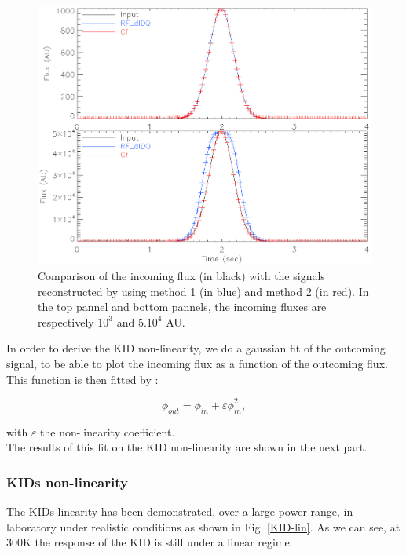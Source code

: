 \begin{figure}[h]
\includegraphics[scale=0.6]{Figures/planets.eps}
\caption{Comparison of the incoming flux (in black) with the signals reconstructed by using method 1 (in blue) and method 2 (in red). In the top pannel and bottom pannels, the incoming fluxes are respectively $10^{3}$ and $5.10^{4}$ AU.}
\label{planet}
\end{figure}

In order to derive the KID non-linearity, we do a gaussian fit of the outcoming signal, to be able to plot the incoming flux as a function of the outcoming flux. This function is then fitted by :

\begin{equation}
\phi_{out} = \phi_{in} + \varepsilon \phi_{in}^{2} ,
\label{fit_NL}
\end{equation}

with $\varepsilon$ the non-linearity coefficient.\\
The results of this fit on the KID non-linearity are shown in the next part.

\subsubsection{KIDs non-linearity}

The KIDs linearity has been demonstrated, over a large power range, in laboratory under realistic conditions as shown in Fig. \ref{KID-lin}. As we can see, at 300K the response of the KID is still under a linear regime.

